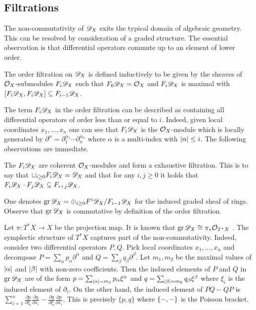\subsection{Filtrations}
The non-commutativity of $\mathscr{D}_X$ exits the typical domain of algebraic geometry.
This can be resolved by consideration of a graded structure.
The essential observation is that differential operators commute up to an element of lower order.
\begin{definition}
  The order filtration on $\mathscr{D}_X$ is defined inductively to be given by the sheaves of $\mathcal{O}_X$-submodules $F_i \mathscr{D}_X$ such that $F_0\mathscr{D}_X = \mathcal{O}_X$ and $F_i\mathscr{D}_X$ is maximal with $[F_i\mathscr{D}_X, F_i \mathscr{D}_X] \subseteq F_{i-1}\mathscr{D}_X$.
\end{definition}
The term $F_i \mathscr{D}_X$ in the order filtration can be described as containing all differential operators of order less than or equal to $i$.
Indeed, given local coordinates $x_1,\ldots, x_n$ one can see that $F_i\mathscr{D}_X$ is the $\mathcal{O}_X$-module which is locally generated by $\partial^\alpha = \partial_1^{\alpha_1}\cdots \partial_n^{\alpha_n}$ where $\alpha$ is a multi-index with $\vert \alpha \vert\leq i$.
The following observations are immediate.
\begin{lemma}
  The $F_i\mathscr{D}_X$ are coherent $\mathcal{O}_X$-modules and form a exhaustive filtration. This is to say that $\cup_{i\geq 0}F_i\mathscr{D}_X = \mathscr{D}_X$
  and that for any $i,j\geq 0$ it holds that $F_i\mathscr{D}_X \cdot F_j \mathscr{D}_X \subseteq F_{i+j}\mathscr{D}_X$.
\end{lemma}
One denotes $\operatorname{gr} \mathscr{D}_X = \oplus_{i\geq 0}F^i\mathscr{D}_X/F_{i-1}\mathscr{D}_X$ for the induced graded sheaf of rings.
Observe that $\operatorname{gr}\mathscr{D}_X$ is commutative by definition of the order filtration.

Let $\pi:T^*X \to X$ be the projection map.
It is known that $\operatorname{gr}\mathscr{D}_X \cong \pi_*\mathcal{O}_{T^*X}$ \cite[Section 2.1]{hotta2007d}.
The symplectic structure of $T^* X$ captures part of the non-commutativity.
Indeed, consider two differential operators $P, Q$.
Pick local coordinates $x_1,\ldots, x_n$ and decompose $P = \sum_{\alpha} p_\alpha \partial^\alpha $ and $Q = \sum_{\beta} q_\beta \partial^\beta$.
Let $m_1,m_2$ be the maximal values of $\vert \alpha \vert$ and $\vert \beta \vert$ with non-zero coefficients.
Then the induced elements of $P$ and $Q$ in $\operatorname{gr} \mathscr{D}_X$ are of the form $p = \sum_{\vert \alpha \vert = m_1} p_\alpha \xi^\alpha$ and $q = \sum_{\vert \beta \vert = m_2}q_\beta \xi^\beta $ where $\xi_i$ is the induced element of $\partial_i$.
On the other hand, the induced element of $PQ - QP$ is $\sum_{i=1}^n\frac{\partial p}{\partial \xi_i}\frac{\partial q}{\partial x_i} - \frac{\partial q}{\partial \xi_i}\frac{\partial p}{\partial x_i}$.
This is precisely $\{p,q\}$ where $\{{-},{-}\}$ is the Poisson bracket.


